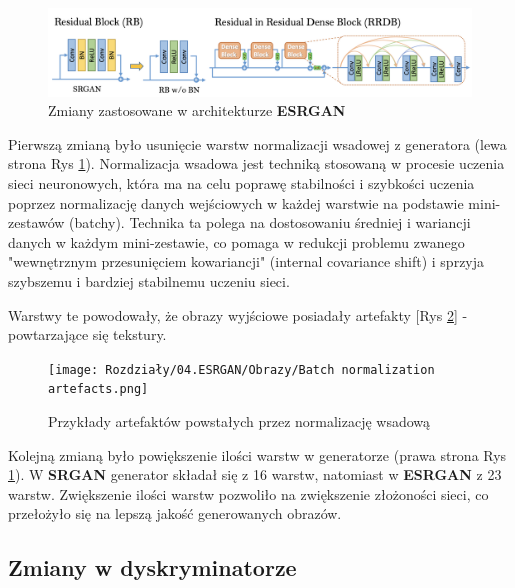 \begin{figure}[ht]
    \centering
    \begin{minipage}[t]{0.85\linewidth}
        \includegraphics[width=\linewidth]{Rozdziały/04.ESRGAN/Obrazy/Architektura ESRGAN 1.png}
        \caption{Zmiany zastosowane w architekturze \textbf{ESRGAN}}
        \label{fig:image63}
    \end{minipage}
\end{figure}

Pierwszą zmianą było usunięcie warstw normalizacji wsadowej z generatora (lewa strona Rys \ref{fig:image63}). 
Normalizacja wsadowa jest techniką stosowaną w procesie uczenia sieci neuronowych, która ma na celu poprawę stabilności i szybkości uczenia poprzez normalizację danych wejściowych w każdej warstwie na podstawie mini-zestawów (batchy). Technika ta polega na dostosowaniu średniej i wariancji danych w każdym mini-zestawie, co pomaga w redukcji problemu zwanego "wewnętrznym przesunięciem kowariancji" (internal covariance shift) i sprzyja szybszemu i bardziej stabilnemu uczeniu sieci.

Warstwy te powodowały, że obrazy wyjściowe posiadały artefakty [Rys \ref{fig:image64}] - powtarzające się tekstury.

\begin{figure}[ht]
    \centering
    \begin{minipage}[t]{0.85\linewidth}
        \texttt{[image: Rozdziały/04.ESRGAN/Obrazy/Batch normalization artefacts.png]}
        \caption{Przykłady artefaktów powstałych przez normalizację wsadową}
        \label{fig:image64}
    \end{minipage}
\end{figure}

Kolejną zmianą było powiększenie ilości warstw w generatorze (prawa strona Rys \ref{fig:image63}). W \textbf{SRGAN} generator składał się z 16 warstw, natomiast w \textbf{ESRGAN} z 23 warstw. Zwiększenie ilości warstw pozwoliło na zwiększenie złożoności sieci, co przełożyło się na lepszą jakość generowanych obrazów.

\subsection*{Zmiany w dyskryminatorze}

